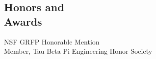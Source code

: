 \documentclass[margin,line]{resume}
\begin{document}
\begin{resume}


    \section{\mysidestyle Honors and\\Awards}

    NSF GRFP Honorable Mention                    \\
    Member, Tau Beta Pi Engineering Honor Society \\

\begin{comment}
    \section{\mysidestyle Relevant Undergraduate Coursework}


\end{comment}
\end{resume}
\end{document}
